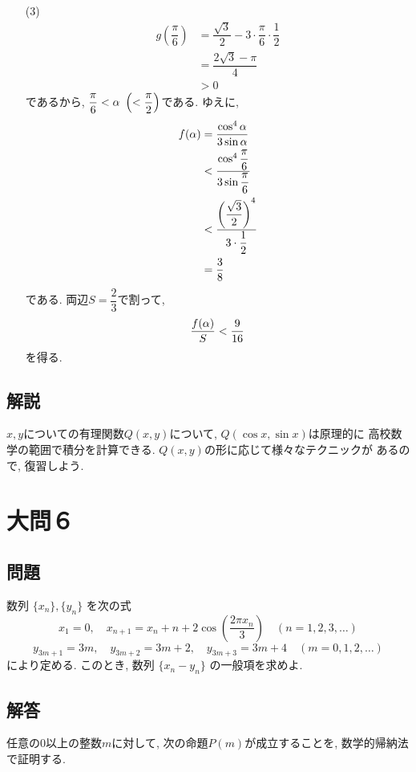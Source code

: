 \documentclass[dvipdfmx,a4paper]{jsarticle}
\begin{document}
\begin{itemize}
        \item [(3)] 
        \begin{align*}
            g\left(\dfrac{\pi}{6}\right) 
            &= \dfrac{\sqrt{3}}{2} -3 \cdot \dfrac{\pi}{6} \cdot \dfrac{1}{2} \\
            &= \dfrac{2\sqrt{3} - \pi }{4} \\
            & >0
        \end{align*}
        であるから, $\dfrac{\pi}{6} < \alpha   \ \left(< \dfrac{\pi}{2}\right)$である. ゆえに, 
        \begin{align*}
            f(\alpha) 
            &= \dfrac{\cos ^4 \alpha}{3\sin \alpha} \\
            &< \dfrac{\cos ^4 \dfrac{\pi}{6}}{3\sin \dfrac{\pi}{6}} \\
            &< \dfrac{\left(\dfrac{\sqrt{3}}{2}\right)^4}{3\cdot \dfrac{1}{2}} \\
            & = \dfrac{3}{8}
        \end{align*}
        である. 両辺$S=\dfrac{2}{3}$で割って, 
        \begin{align*}
            \dfrac{f(\alpha)}{S} < \dfrac{9}{16}
        \end{align*}
        を得る. 
    \end{itemize}

    \subsection{解説}
    $x,y$についての有理関数$Q(x,y)$について, $Q(\cos x, \sin x)$は原理的に
    高校数学の範囲で積分を計算できる. $Q(x,y)$の形に応じて様々なテクニックが
    あるので, 復習しよう. 



    \section{大問６}
    \subsection{問題}
    数列 $\{x_n\}, \{y_n\}$ を次の式
    \[
        x_1 = 0, \quad x_{n+1} = x_n + n + 2\cos\left( \frac{2\pi x_n}{3} \right) \quad (n=1, 2, 3, \ldots)
    \]
    \[
        y_{3m+1} = 3m, \quad y_{3m+2} = 3m+2, \quad y_{3m+3} = 3m+4 \quad (m=0, 1, 2, \ldots)
    \]
    により定める. このとき, 数列 $\{x_n - y_n\}$ の一般項を求めよ. 

    \subsection{解答}
    任意の0以上の整数$m$に対して, 次の命題$P(m)$が成立することを, 数学的帰納法で証明する. 
    
\end{document}
